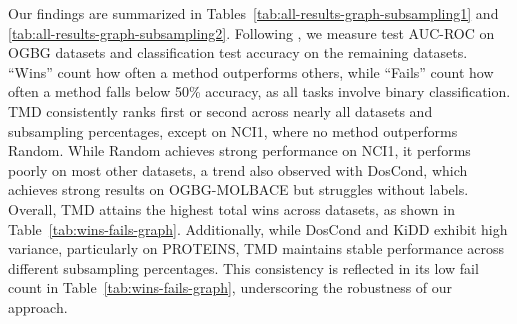 Our findings are summarized in Tables~\ref{tab:all-results-graph-subsampling1} and \ref{tab:all-results-graph-subsampling2}. Following \citet{jin2022condensing}, we measure test AUC-ROC on OGBG datasets and classification test accuracy on the remaining datasets. ``Wins'' count how often a method outperforms others, while ``Fails'' count how often a method falls below 50\% accuracy, as all tasks involve binary classification.  TMD consistently ranks first or second across nearly all datasets and subsampling percentages, except on NCI1, where no method outperforms Random. While Random achieves strong performance on NCI1, it performs poorly on most other datasets, a trend also observed with DosCond, which achieves strong results on OGBG-MOLBACE but struggles without labels. Overall, TMD attains the highest total wins across datasets, as shown in Table~\ref{tab:wins-fails-graph}. Additionally, while DosCond and KiDD exhibit high variance, particularly on PROTEINS, TMD maintains stable performance across different subsampling percentages. This consistency is reflected in its low fail count in Table~\ref{tab:wins-fails-graph}, underscoring the robustness of our approach.  

